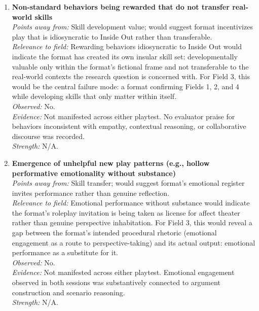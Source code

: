 \documentclass[12pt]{article}
\begin{document}
\begin{enumerate}

\item \textbf{Non-standard behaviors being rewarded that do not transfer real-world skills}\\
\textit{Points away from:} Skill development value; would suggest format incentivizes play that is idiosyncratic to Inside Out rather than transferable.\\
\textit{Relevance to field:} Rewarding behaviors idiosyncratic to Inside Out would indicate the format has created its own insular skill set: developmentally valuable only within the format's fictional frame and not transferable to the real-world contexts the research question is concerned with. For Field 3, this would be the central failure mode: a format confirming Fields 1, 2, and 4 while developing skills that only matter within itself.\\
\textit{Observed:} No.\\
\textit{Evidence:} Not manifested across either playtest. No evaluator praise for behaviors inconsistent with empathy, contextual reasoning, or collaborative discourse was recorded.\\
\textit{Strength:} N/A.

\item \textbf{Emergence of unhelpful new play patterns (e.g., hollow performative emotionality without substance)}\\
\textit{Points away from:} Skill transfer; would suggest format's emotional register invites performance rather than genuine reflection.\\
\textit{Relevance to field:} Emotional performance without substance would indicate the format's roleplay invitation is being taken as license for affect theater rather than genuine perspective inhabitation. For Field 3, this would reveal a gap between the format's intended procedural rhetoric (emotional engagement as a route to perspective-taking) and its actual output: emotional performance as a substitute for it.\\
\textit{Observed:} No.\\
\textit{Evidence:} Not manifested across either playtest. Emotional engagement observed in both sessions was substantively connected to argument construction and scenario reasoning.\\
\textit{Strength:} N/A.


\end{enumerate}
\end{document}
